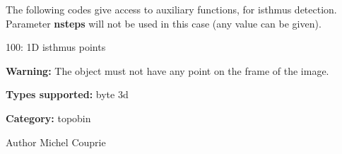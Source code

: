 The following codes give access to auxiliary functions, for isthmus detection. Parameter {\bfseries nsteps} will not be used in this case (any value can be given).

\begin{DoxyItemize}
\item 100: 1D isthmus points\end{DoxyItemize}
{\bfseries Warning:} The object must not have any point on the frame of the image.

{\bfseries Types supported:} byte 3d

{\bfseries Category:} topobin

\begin{DoxyAuthor}{Author}
Michel Couprie 
\end{DoxyAuthor}
